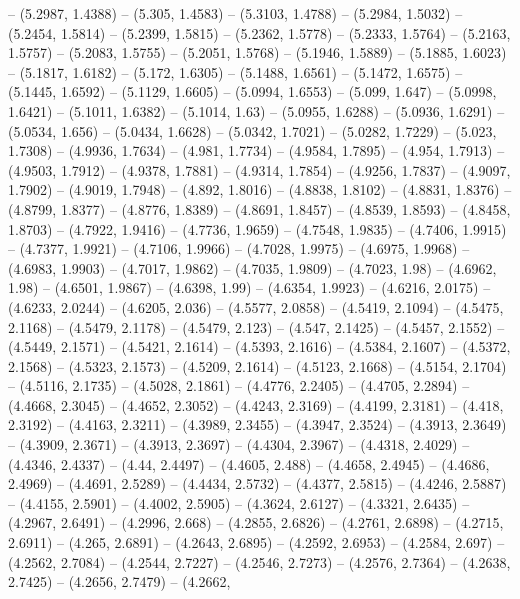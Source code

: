 {   -- (5.2987, 1.4388) -- (5.305, 1.4583) -- (5.3103, 1.4788) -- (5.2984, 
  1.5032) -- (5.2454, 1.5814) -- (5.2399, 1.5815) -- (5.2362, 1.5778) -- 
  (5.2333, 1.5764) -- (5.2163, 1.5757) -- (5.2083, 1.5755) -- (5.2051, 1.5768) 
  -- (5.1946, 1.5889) -- (5.1885, 1.6023) -- (5.1817, 1.6182) -- (5.172, 1.6305)
   -- (5.1488, 1.6561) -- (5.1472, 1.6575) -- (5.1445, 1.6592) -- (5.1129, 
  1.6605) -- (5.0994, 1.6553) -- (5.099, 1.647) -- (5.0998, 1.6421) -- (5.1011, 
  1.6382) -- (5.1014, 1.63) -- (5.0955, 1.6288) -- (5.0936, 1.6291) -- (5.0534, 
  1.656) -- (5.0434, 1.6628) -- (5.0342, 1.7021) -- (5.0282, 1.7229) -- (5.023, 
  1.7308) -- (4.9936, 1.7634) -- (4.981, 1.7734) -- (4.9584, 1.7895) -- (4.954, 
  1.7913) -- (4.9503, 1.7912) -- (4.9378, 1.7881) -- (4.9314, 1.7854) -- 
  (4.9256, 1.7837) -- (4.9097, 1.7902) -- (4.9019, 1.7948) -- (4.892, 1.8016) --
   (4.8838, 1.8102) -- (4.8831, 1.8376) -- (4.8799, 1.8377) -- (4.8776, 1.8389) 
  -- (4.8691, 1.8457) -- (4.8539, 1.8593) -- (4.8458, 1.8703) -- (4.7922, 
  1.9416) -- (4.7736, 1.9659) -- (4.7548, 1.9835) -- (4.7406, 1.9915) -- 
  (4.7377, 1.9921) -- (4.7106, 1.9966) -- (4.7028, 1.9975) -- (4.6975, 1.9968) 
  -- (4.6983, 1.9903) -- (4.7017, 1.9862) -- (4.7035, 1.9809) -- (4.7023, 1.98) 
  -- (4.6962, 1.98) -- (4.6501, 1.9867) -- (4.6398, 1.99) -- (4.6354, 1.9923) --
   (4.6216, 2.0175) -- (4.6233, 2.0244) -- (4.6205, 2.036) -- (4.5577, 2.0858) 
  -- (4.5419, 2.1094) -- (4.5475, 2.1168) -- (4.5479, 2.1178) -- (4.5479, 2.123)
   -- (4.547, 2.1425) -- (4.5457, 2.1552) -- (4.5449, 2.1571) -- (4.5421, 
  2.1614) -- (4.5393, 2.1616) -- (4.5384, 2.1607) -- (4.5372, 2.1568) -- 
  (4.5323, 2.1573) -- (4.5209, 2.1614) -- (4.5123, 2.1668) -- (4.5154, 2.1704) 
  -- (4.5116, 2.1735) -- (4.5028, 2.1861) -- (4.4776, 2.2405) -- (4.4705, 
  2.2894) -- (4.4668, 2.3045) -- (4.4652, 2.3052) -- (4.4243, 2.3169) -- 
  (4.4199, 2.3181) -- (4.418, 2.3192) -- (4.4163, 2.3211) -- (4.3989, 2.3455) --
   (4.3947, 2.3524) -- (4.3913, 2.3649) -- (4.3909, 2.3671) -- (4.3913, 2.3697) 
  -- (4.4304, 2.3967) -- (4.4318, 2.4029) -- (4.4346, 2.4337) -- (4.44, 2.4497) 
  -- (4.4605, 2.488) -- (4.4658, 2.4945) -- (4.4686, 2.4969) -- (4.4691, 2.5289)
   -- (4.4434, 2.5732) -- (4.4377, 2.5815) -- (4.4246, 2.5887) -- (4.4155, 
  2.5901) -- (4.4002, 2.5905) -- (4.3624, 2.6127) -- (4.3321, 2.6435) -- 
  (4.2967, 2.6491) -- (4.2996, 2.668) -- (4.2855, 2.6826) -- (4.2761, 2.6898) --
   (4.2715, 2.6911) -- (4.265, 2.6891) -- (4.2643, 2.6895) -- (4.2592, 2.6953) 
  -- (4.2584, 2.697) -- (4.2562, 2.7084) -- (4.2544, 2.7227) -- (4.2546, 2.7273)
   -- (4.2576, 2.7364) -- (4.2638, 2.7425) -- (4.2656, 2.7479) -- (4.2662, 
}
